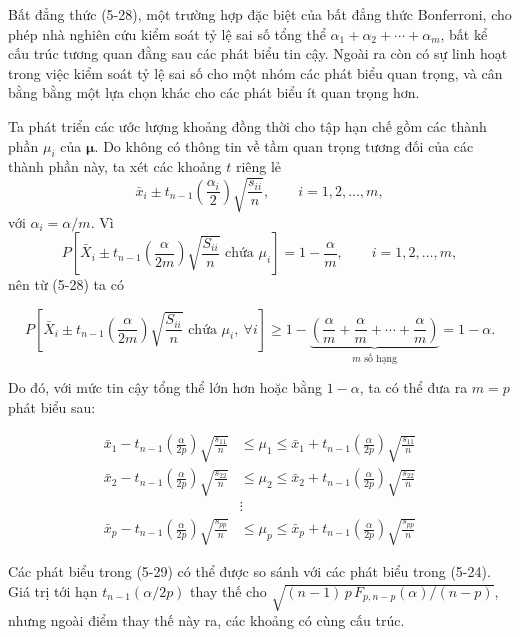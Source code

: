 Bất đẳng thức (5-28), một trường hợp đặc biệt của bất đẳng thức Bonferroni, cho phép nhà nghiên cứu kiểm soát tỷ lệ sai số tổng thể $\alpha_1+\alpha_2+\cdots+\alpha_m$, bất kể cấu trúc tương quan đằng sau các phát biểu tin cậy. Ngoài ra còn có sự linh hoạt trong việc kiểm soát tỷ lệ sai số cho một nhóm các phát biểu quan trọng, và cân bằng bằng một lựa chọn khác cho các phát biểu ít quan trọng hơn.
 
Ta phát triển các ước lượng khoảng đồng thời cho tập hạn chế gồm các thành phần $\mu_i$ của $\boldsymbol{\mu}$. Do không có thông tin về tầm quan trọng tương đối của các thành phần này, ta xét các khoảng $t$ riêng lẻ
\[
\bar{x}_i
\pm
t_{n-1}\left(\frac{\alpha_i}{2}\right)
\sqrt{\frac{s_{ii}}{n}},
\qquad i=1,2,\ldots,m,
\]
với $\alpha_i=\alpha/m$. Vì
\[
P\left[
\bar{X}_i
\pm
t_{n-1}\left(\frac{\alpha}{2m}\right)
\sqrt{\frac{S_{ii}}{n}}
\text{ chứa }\mu_i
\right]
=
1-\frac{\alpha}{m},
\qquad i=1,2,\ldots,m,
\]
nên từ (5-28) ta có
 
\[
P\left[
\bar{X}_i
\pm
t_{n-1}\left(\frac{\alpha}{2m}\right)
\sqrt{\frac{S_{ii}}{n}}
\text{ chứa }\mu_i,\ \forall i
\right]
\geq
1-
\underbrace{\left(
\frac{\alpha}{m}
+\frac{\alpha}{m}
+\cdots+
\frac{\alpha}{m}
\right)}_{m\text{ số hạng}}
=
1-\alpha.
\]
 
Do đó, với mức tin cậy tổng thể lớn hơn hoặc bằng $1-\alpha$, ta có thể đưa ra $m=p$ phát biểu sau:
 
\begin{equation*}
\tag{5-29}
\begin{aligned}
\bar{x}_1
-
t_{n-1}\left(\frac{\alpha}{2p}\right)
\sqrt{\frac{s_{11}}{n}}
&\leq
\mu_1
\leq
\bar{x}_1
+
t_{n-1}\left(\frac{\alpha}{2p}\right)
\sqrt{\frac{s_{11}}{n}}
\\[4pt]
\bar{x}_2
-
t_{n-1}\left(\frac{\alpha}{2p}\right)
\sqrt{\frac{s_{22}}{n}}
&\leq
\mu_2
\leq
\bar{x}_2
+
t_{n-1}\left(\frac{\alpha}{2p}\right)
\sqrt{\frac{s_{22}}{n}}
\\[-1pt]
&\vdots
\\[-1pt]
\bar{x}_p
-
t_{n-1}\left(\frac{\alpha}{2p}\right)
\sqrt{\frac{s_{pp}}{n}}
&\leq
\mu_p
\leq
\bar{x}_p
+
t_{n-1}\left(\frac{\alpha}{2p}\right)
\sqrt{\frac{s_{pp}}{n}}
\end{aligned}
\end{equation*}
 
Các phát biểu trong (5-29) có thể được so sánh với các phát biểu trong (5-24).
Giá trị tới hạn $t_{n-1}(\alpha/2p)$ thay thế cho
$\sqrt{(n-1)\,p\,F_{p,n-p}(\alpha)/(n-p)}$, nhưng ngoài điểm thay thế này ra,
các khoảng có cùng cấu trúc.
 
